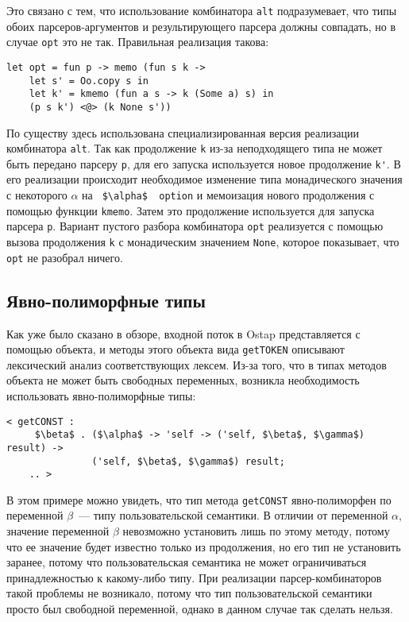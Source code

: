 \documentclass[conference]{IEEEtran}
\begin{document}
Это связано с тем, что использование комбинатора \lstinline|alt| подразумевает, что типы обоих парсеров-аргументов и результирующего парсера должны совпадать,
но в случае \lstinline|opt| это не так. Правильная реализация такова:

\begin{lstlisting}[basicstyle=\small]
  let opt = fun p -> memo (fun s k ->
    let s' = Oo.copy s in
    let k' = kmemo (fun a s -> k (Some a) s) in
    (p s k') <@> (k None s'))
\end{lstlisting}

По существу здесь использована специализированная версия реализации комбинатора \lstinline|alt|. Так как продолжение \lstinline|k| из-за неподходящего типа не может быть передано парсеру
\lstinline|p|, для его запуска используется новое продолжение \lstinline|k'|. В его реализации происходит необходимое изменение типа монадического значения
с некоторого $\alpha$ на \lstinline| $\alpha$  option| и мемоизация нового продолжения с помощью функции \lstinline|kmemo|. Затем это продолжение используется для
запуска парсера \lstinline|p|. Вариант пустого разбора комбинатора \lstinline|opt| реализуется с помощью вызова продолжения \lstinline|k| с монадическим значением \lstinline|None|,
которое показывает, что \lstinline|opt| не разобрал ничего.

\subsection{Явно-полиморфные типы}

Как уже было сказано в обзоре, входной поток в Ostap представляется с помощью объекта, и методы этого объекта вида \lstinline|getTOKEN| описывают лексический анализ
соответствующих лексем. Из-за того, что в типах методов объекта не может быть свободных переменных, возникла необходимость использовать явно-полиморфные типы:

\begin{lstlisting}[basicstyle=\small]
  < getCONST :
     $\beta$ . ($\alpha$ -> 'self -> ('self, $\beta$, $\gamma$) result) ->
               ('self, $\beta$, $\gamma$) result;
    .. >
\end{lstlisting}

В этом примере можно увидеть, что тип метода \lstinline|getCONST| явно-полиморфен по переменной $\beta$~--- типу пользовательской семантики. В отличии от переменной $\alpha$,
значение переменной $\beta$ невозможно установить лишь по этому методу, потому что ее значение будет известно только из продолжения, но его тип не установить заранее,
потому что пользовательская семантика не может ограничиваться принадлежностью к какому-либо типу. При реализации парсер-комбинаторов такой проблемы не возникало,
потому что тип пользовательской семантики просто был свободной переменной, однако в данном случае так сделать нельзя.
\end{document}

